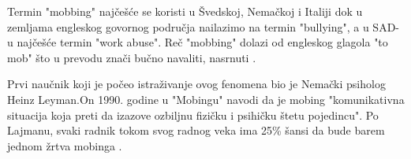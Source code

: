 \documentclass[a4paper]{article}
\newcommand{\quotes}[1]{"#1"}
\begin{document}
        Termin \quotes{mobbing} najčešće se koristi u Švedskoj, Nemačkoj i Italiji dok u zemljama engleskog govornog područja nailazimo na termin \quotes{bullying}, a u SAD-u najčešće termin \quotes{work abuse}. Reč \quotes{mobbing} dolazi od engleskog glagola \quotes{to mob} što u prevodu znači bučno navaliti, nasrnuti \cite{stajemobing}.
        
        Prvi naučnik koji je počeo istraživanje ovog fenomena bio je Nemački psiholog Heinz Leyman.\hspace{0.1cm}On 1990. godine u \quotes{Mobingu} navodi da je mobing \quotes{komunikativna situacija koja preti da izazove ozbiljnu fizičku i psihičku štetu pojedincu}. Po Lajmanu, svaki radnik tokom svog radnog veka ima 25\% šansi da bude barem jednom žrtva mobinga \cite{leymannmobbing}.
        
\end{document}
